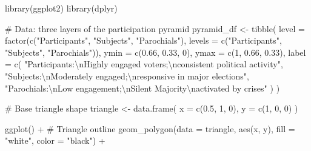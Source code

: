 \documentclass[
  11pt,
]{article}
\newenvironment{Shaded}{\begin{snugshade}}{\end{snugshade}}
\newcommand{\AttributeTok}[1]{\textcolor[rgb]{0.40,0.45,0.13}{#1}}
\newcommand{\CommentTok}[1]{\textcolor[rgb]{0.37,0.37,0.37}{#1}}
\newcommand{\DecValTok}[1]{\textcolor[rgb]{0.68,0.00,0.00}{#1}}
\newcommand{\FloatTok}[1]{\textcolor[rgb]{0.68,0.00,0.00}{#1}}
\newcommand{\FunctionTok}[1]{\textcolor[rgb]{0.28,0.35,0.67}{#1}}
\newcommand{\NormalTok}[1]{\textcolor[rgb]{0.00,0.23,0.31}{#1}}
\newcommand{\OtherTok}[1]{\textcolor[rgb]{0.00,0.23,0.31}{#1}}
\newcommand{\SpecialCharTok}[1]{\textcolor[rgb]{0.37,0.37,0.37}{#1}}
\newcommand{\StringTok}[1]{\textcolor[rgb]{0.13,0.47,0.30}{#1}}
\begin{document}
\begin{Shaded}
\begin{Highlighting}[]
\FunctionTok{library}\NormalTok{(ggplot2)}
\FunctionTok{library}\NormalTok{(dplyr)}

\CommentTok{\# Data: three layers of the participation pyramid}
\NormalTok{pyramid\_df }\OtherTok{\textless{}{-}} \FunctionTok{tibble}\NormalTok{(}
  \AttributeTok{level =} \FunctionTok{factor}\NormalTok{(}\FunctionTok{c}\NormalTok{(}\StringTok{"Participants"}\NormalTok{, }\StringTok{"Subjects"}\NormalTok{, }\StringTok{"Parochials"}\NormalTok{), }
                 \AttributeTok{levels =} \FunctionTok{c}\NormalTok{(}\StringTok{"Participants"}\NormalTok{, }\StringTok{"Subjects"}\NormalTok{, }\StringTok{"Parochials"}\NormalTok{)),}
  \AttributeTok{ymin =} \FunctionTok{c}\NormalTok{(}\FloatTok{0.66}\NormalTok{, }\FloatTok{0.33}\NormalTok{, }\DecValTok{0}\NormalTok{),}
  \AttributeTok{ymax =} \FunctionTok{c}\NormalTok{(}\DecValTok{1}\NormalTok{, }\FloatTok{0.66}\NormalTok{, }\FloatTok{0.33}\NormalTok{),}
  \AttributeTok{label =} \FunctionTok{c}\NormalTok{(}
    \StringTok{"Participants:}\SpecialCharTok{\textbackslash{}n}\StringTok{Highly engaged voters;}\SpecialCharTok{\textbackslash{}n}\StringTok{consistent political activity"}\NormalTok{,}
    \StringTok{"Subjects:}\SpecialCharTok{\textbackslash{}n}\StringTok{Moderately engaged;}\SpecialCharTok{\textbackslash{}n}\StringTok{responsive in major elections"}\NormalTok{,}
    \StringTok{"Parochials:}\SpecialCharTok{\textbackslash{}n}\StringTok{Low engagement;}\SpecialCharTok{\textbackslash{}n}\StringTok{\textquotesingle{}Silent Majority\textquotesingle{}}\SpecialCharTok{\textbackslash{}n}\StringTok{activated by crises"}
\NormalTok{  )}
\NormalTok{)}

\CommentTok{\# Base triangle shape}
\NormalTok{triangle }\OtherTok{\textless{}{-}} \FunctionTok{data.frame}\NormalTok{(}
  \AttributeTok{x =} \FunctionTok{c}\NormalTok{(}\FloatTok{0.5}\NormalTok{, }\DecValTok{1}\NormalTok{, }\DecValTok{0}\NormalTok{),}
  \AttributeTok{y =} \FunctionTok{c}\NormalTok{(}\DecValTok{1}\NormalTok{, }\DecValTok{0}\NormalTok{, }\DecValTok{0}\NormalTok{)}
\NormalTok{)}

\FunctionTok{ggplot}\NormalTok{() }\SpecialCharTok{+}
  \CommentTok{\# Triangle outline}
  \FunctionTok{geom\_polygon}\NormalTok{(}\AttributeTok{data =}\NormalTok{ triangle, }\FunctionTok{aes}\NormalTok{(x, y), }\AttributeTok{fill =} \StringTok{"white"}\NormalTok{, }\AttributeTok{color =} \StringTok{"black"}\NormalTok{) }\SpecialCharTok{+}
  

\end{Highlighting}
\end{Shaded}
\end{document}
